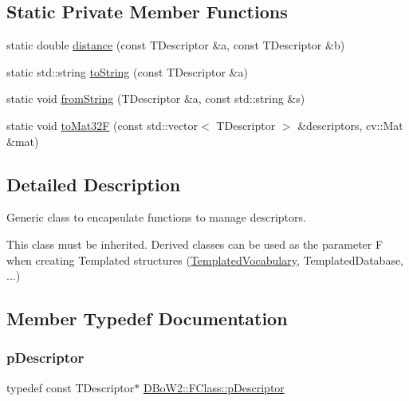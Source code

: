 \subsection*{Static Private Member Functions}
\begin{DoxyCompactItemize}
\item 
static double \mbox{\hyperlink{class_d_bo_w2_1_1_f_class_a56d4737dd67258389c808dbd10befa8c}{distance}} (const T\+Descriptor \&a, const T\+Descriptor \&b)
\item 
static std\+::string \mbox{\hyperlink{class_d_bo_w2_1_1_f_class_aeb2561d74f7d9057c0887c12350f00c2}{to\+String}} (const T\+Descriptor \&a)
\item 
static void \mbox{\hyperlink{class_d_bo_w2_1_1_f_class_a0f27985bf4c13f0a6c12ebc4822c1217}{from\+String}} (T\+Descriptor \&a, const std\+::string \&s)
\item 
static void \mbox{\hyperlink{class_d_bo_w2_1_1_f_class_a28a6ac7c718818f7a068a4aaae3e3b45}{to\+Mat32F}} (const std\+::vector$<$ T\+Descriptor $>$ \&descriptors, cv\+::\+Mat \&mat)
\end{DoxyCompactItemize}


\subsection{Detailed Description}
Generic class to encapsulate functions to manage descriptors. 

This class must be inherited. Derived classes can be used as the parameter F when creating Templated structures (\mbox{\hyperlink{class_d_bo_w2_1_1_templated_vocabulary}{Templated\+Vocabulary}}, Templated\+Database, ...) 

\subsection{Member Typedef Documentation}
\mbox{\label{class_d_bo_w2_1_1_f_class_a9c94e662003f61413fd542d67b45c3a9}} 
\subsubsection{\texorpdfstring{p\+Descriptor}{pDescriptor}}
{\footnotesize\ttfamily typedef const T\+Descriptor$\ast$ \mbox{\hyperlink{class_d_bo_w2_1_1_f_class_a9c94e662003f61413fd542d67b45c3a9}{D\+Bo\+W2\+::\+F\+Class\+::p\+Descriptor}}\hspace{0.3cm}{\ttfamily [private]}}



